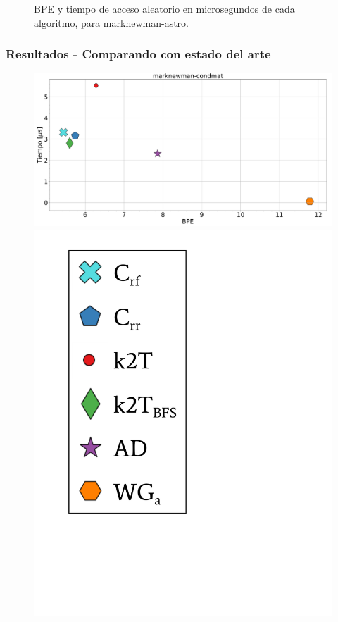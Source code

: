 \begin{frame}
\begin{figure}
	\caption{BPE y tiempo de acceso aleatorio en microsegundos de cada algoritmo, para marknewman-astro.}
\end{figure}

\end{frame}

\begin{frame}
\frametitle{Resultados - Comparando con estado del arte}

\begin{figure}
	\centering
	
    	\begin{minipage}{1\textwidth}
    		\centering
    		\begin{minipage}{0.8\textwidth}
    			\centering
    			\includegraphics[width=1\linewidth]{../img/bpeTimes/aleatorio/marknewman-condmat.pdf}
    		\end{minipage}
    		\begin{minipage}{0.15\textwidth}
    			\centering
    			\includegraphics[scale=.16, clip, trim=70 200 280 40]{../img/bpeTimes/labelAle.pdf}

\end{minipage}
\end{minipage}
\end{figure}
\end{frame}

